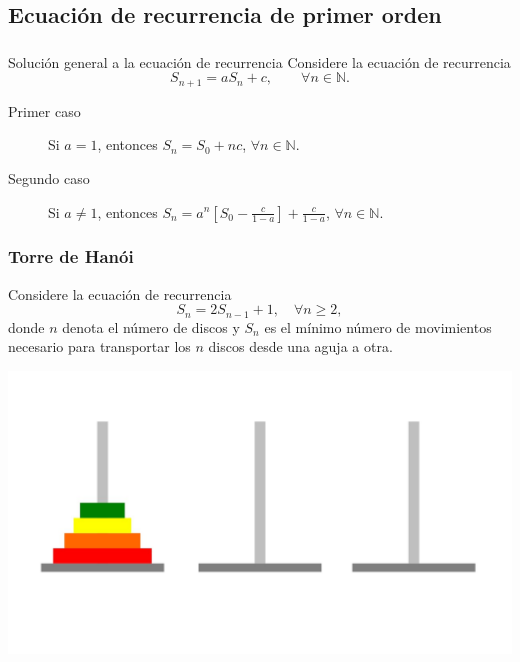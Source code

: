 \subsection{Ecuación de recurrencia de primer orden}

\begin{frame}
\frametitle{\secname}
\framesubtitle{\subsecname}

\begin{block}{Solución general a la ecuación de recurrencia}
	Considere la ecuación de recurrencia \[ S_{n+1}=aS_{n}+c,\qquad\forall n\in\mathds{N}. \]
	\begin{description}
		\item[Primer caso] Si $a=1$, entonces $S_{n}= S_{0}+nc$, $\forall n\in \mathds{N}$.
		\item[Segundo caso] Si $a\neq1$, entonces $S_{n}=a^{n}\left[S_{0}-\frac{c}{1-a}\right]+\frac{c}{1-a}$, $\forall n\in\mathds{N}$.
	\end{description}
	\end{block}
\end{frame}

\subsubsection{Torre de Hanói}

\begin{frame}
\begin{minipage}{0.45\paperwidth}
Considere la ecuación de recurrencia \[ S_{n}=2S_{n-1}+1,\quad\forall n\geq2, \] donde $n$ denota el número de discos y $S_{n}$ es el mínimo número de movimientos necesario para transportar los $n$ discos desde una aguja a otra.
\end{minipage}
\hfill
\begin{minipage}{0.45\paperwidth}
\includegraphics[width=0.4\paperwidth]{torre.jpg}
\end{minipage}
\end{frame}

